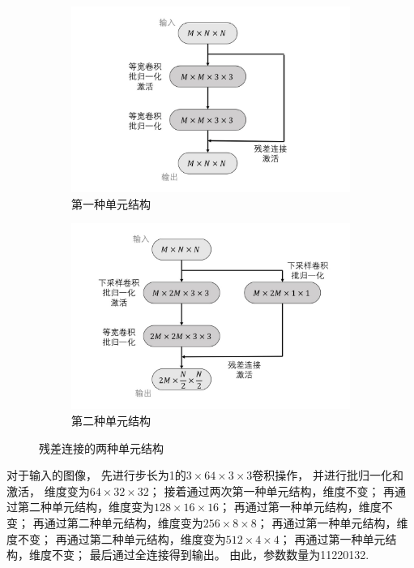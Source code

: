 \documentclass[12pt]{article}
\begin{document}
\begin{figure}[h]
	\begin{subfigure}{0.5\textwidth}
	    \includegraphics[width=\linewidth]{graph/ResNetI.jpg}
	    \caption{第一种单元结构}
    \end{subfigure}
    \begin{subfigure}{0.5\textwidth}
    	\includegraphics[width=\linewidth]{graph/ResNetII.jpg}
    	\caption{第二种单元结构}
    \end{subfigure}
    \caption{残差连接的两种单元结构}
	\label{fig:ResNet}
\end{figure}

对于输入的图像，
先进行步长为1的$3\times64\times3\times3$卷积操作，
并进行批归一化和激活，
维度变为$64\times32\times32$；
接着通过两次第一种单元结构，维度不变；
再通过第二种单元结构，维度变为$128\times16\times16$；
再通过第一种单元结构，维度不变；
再通过第二种单元结构，维度变为$256\times8\times8$；
再通过第一种单元结构，维度不变；
再通过第二种单元结构，维度变为$512\times4\times4$；
再通过第一种单元结构，维度不变；
最后通过全连接得到输出。
由此，参数数量为11220132.
\end{document}
